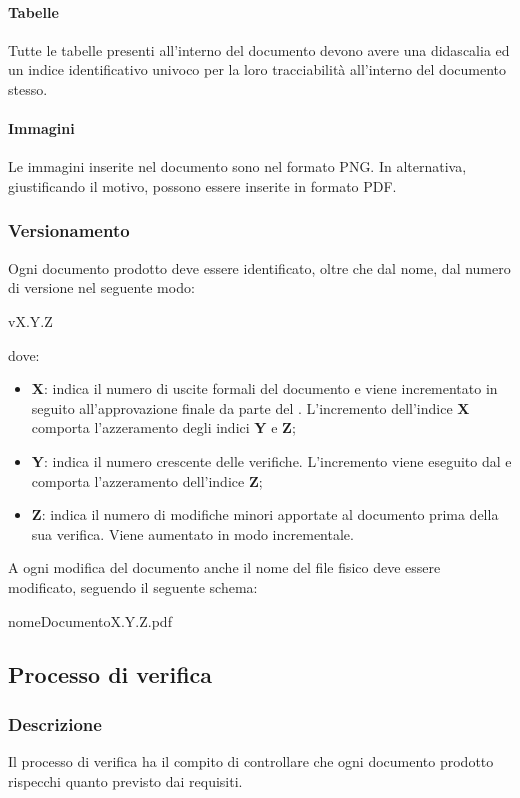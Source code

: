 \paragraph{Tabelle}
Tutte le tabelle presenti all'interno del documento devono avere una didascalia 
ed un indice identificativo univoco per la loro tracciabilità all'interno del 
documento stesso.
\paragraph{Immagini}
Le immagini inserite nel documento sono nel formato PNG. In alternativa, 
giustificando il motivo, possono essere inserite in formato PDF.
\subsubsection{Versionamento}
Ogni documento prodotto deve essere identificato, oltre che dal nome, dal numero 
di versione nel seguente modo:
\begin{center}
  vX.Y.Z
\end{center}
dove:

\begin{itemize}
  \item \textbf{X}: indica il numero di uscite formali del documento e viene 
  incrementato in seguito all'approvazione finale da parte del \textit{\RdP}. 
  L'incremento dell'indice \textbf{X} comporta l'azzeramento degli indici 
  \textbf{Y} e \textbf{Z};
  \item \textbf{Y}: indica il numero crescente delle verifiche. L'incremento viene eseguito 
  dal \textit{\Ver} e comporta l'azzeramento dell'indice 
  \textbf{Z};
  \item \textbf{Z}: indica il numero di modifiche minori apportate al documento 
  prima della sua verifica. Viene aumentato in modo incrementale. 
  \end{itemize}
A ogni modifica del documento anche il nome del file fisico deve essere 
modificato, seguendo il seguente schema:
\begin{center}
  nomeDocumentoX.Y.Z.pdf
\end{center}

\subsection{Processo di verifica}
\subsubsection{Descrizione}
Il processo di verifica ha il compito di controllare che ogni documento prodotto 
rispecchi quanto previsto dai requisiti.
